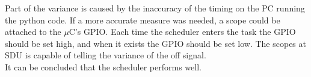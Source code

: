 Part of the variance is caused by the inaccuracy of the timing on the PC running the python code. If a more accurate measure was needed, a scope could be attached to the $\mu$C's GPIO. Each time the scheduler enters the task the GPIO should be set high, and when it exists the GPIO should be set low. The scopes at SDU is capable of telling the variance of the off signal. \\
It can be concluded that the scheduler performs well.